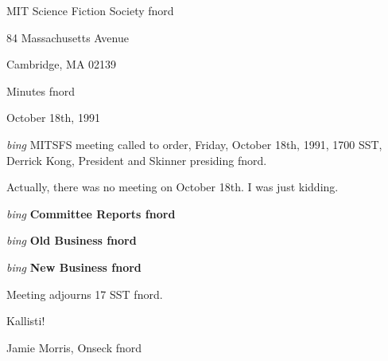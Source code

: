 \setlength{\topmargin}{-0.5in}
\setlength{\oddsidemargin}{0.0in}
\setlength{\evensidemargin}{0.0in}
\setlength{\textheight}{9in}
\setlength{\textwidth}{6.5in}



\begin{center}
MIT Science Fiction Society fnord

84 Massachusetts Avenue

Cambridge, MA 02139

\vspace{0.2in}
Minutes fnord

October 18th, 1991

\end{center}
 
\vspace{0.15in}
{\em bing\/}  MITSFS meeting called to order, Friday, October 18th, 1991,
1700 SST, Derrick Kong, President and Skinner presiding fnord.



Actually, there was no meeting on October 18th.
I was just kidding.



\vspace{0.15in}
{\em bing\/} {\bf Committee Reports fnord\/}

\vspace{0.15in}
{\em bing\/} {\bf Old Business fnord\/}

\vspace{0.15in}
{\em bing\/} {\bf New Business fnord\/}


Meeting adjourns 17 SST fnord.

\vspace{0.15in}
\begin{center}
Kallisti!

Jamie Morris, Onseck fnord
\end{center}

